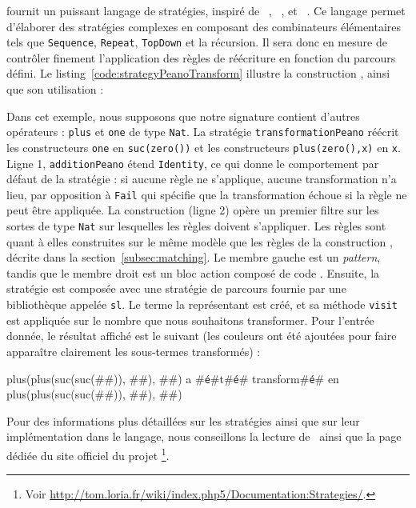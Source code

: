 {\tom} fournit un puissant langage de stratégies, inspiré de
{\elan}~\cite{Borovansky1998}, {\stratego}~\cite{Visser1998},
et {\jjtrav}~\cite{Visser2001}. Ce langage permet d'élaborer des stratégies
complexes en composant des combinateurs élémentaires tels que
\texttt{Sequence}, \texttt{Repeat}, \texttt{TopDown} et la récursion. Il sera
donc en mesure de contrôler finement l'application des règles de réécriture en
fonction du parcours défini. Le listing~\ref{code:strategyPeanoTransform}
illustre la construction , ainsi que son utilisation :


Dans cet exemple, nous supposons que notre signature contient d'autres
opérateurs : \texttt{plus} et \texttt{one} de type \texttt{Nat}. La stratégie
\texttt{transformationPeano} réécrit les constructeurs \texttt{one} en
\texttt{suc(zero())} et les constructeurs \texttt{plus(zero(),x)} en
\texttt{x}. Ligne 1, \texttt{additionPeano} étend \texttt{Identity}, ce qui
donne le comportement par défaut de la stratégie : si aucune
règle ne s'applique, aucune transformation n'a lieu, par opposition à
\texttt{Fail} qui spécifie que la transformation échoue si la règle ne peut
être appliquée. La construction  (ligne 2) opère un premier filtre
sur les sortes de type \texttt{Nat} sur lesquelles les règles doivent
s'appliquer. Les règles sont quant à elles construites sur le même modèle que
les règles de la construction , décrite dans la
section~\ref{subsec:matching}. Le membre gauche est un \emph{pattern}, tandis
que le membre droit est un bloc action composé de code {\tomjava}. Ensuite, la
stratégie est composée avec une stratégie de parcours fournie par une
bibliothèque appelée \texttt{sl}. Le terme la représentant est créé, et sa
méthode \texttt{visit} est appliquée sur le nombre que nous souhaitons
transformer. Pour l'entrée donnée, le résultat affiché est le suivant (les 
couleurs ont été ajoutées pour faire apparaître clairement les sous-termes
transformés) :
\begin{tomcode4}
  plus(plus(suc(suc(##)), ##), ##) 
    a #\texttt{é}#t#\texttt{é}# transform#\texttt{é}# en 
  plus(plus(suc(suc(##)), ##), ##)
\end{tomcode4}

Pour des informations plus détaillées sur les stratégies {\tom} ainsi que sur
leur implémentation dans le langage, nous conseillons la lecture
de~\cite{Balland2009, BallandMR08, Balland2012} ainsi que la page dédiée du
site officiel du projet
{\tom}\footnote{Voir
  \url{http://tom.loria.fr/wiki/index.php5/Documentation:Strategies/}.}.

